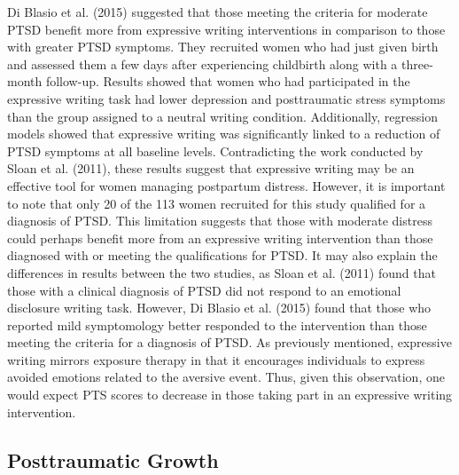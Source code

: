 \documentclass[english,man]{apa6}
\theoremstyle{definition}
\theoremstyle{definition}
\theoremstyle{definition}
\theoremstyle{remark}
\begin{document}
Di Blasio et al. (2015) suggested that those meeting the criteria for
moderate PTSD benefit more from expressive writing interventions in
comparison to those with greater PTSD symptoms. They recruited women who
had just given birth and assessed them a few days after experiencing
childbirth along with a three-month follow-up. Results showed that women
who had participated in the expressive writing task had lower depression
and posttraumatic stress symptoms than the group assigned to a neutral
writing condition. Additionally, regression models showed that
expressive writing was significantly linked to a reduction of PTSD
symptoms at all baseline levels. Contradicting the work conducted by
Sloan et al. (2011), these results suggest that expressive writing may
be an effective tool for women managing postpartum distress. However, it
is important to note that only 20 of the 113 women recruited for this
study qualified for a diagnosis of PTSD. This limitation suggests that
those with moderate distress could perhaps benefit more from an
expressive writing intervention than those diagnosed with or meeting the
qualifications for PTSD. It may also explain the differences in results
between the two studies, as Sloan et al. (2011) found that those with a
clinical diagnosis of PTSD did not respond to an emotional disclosure
writing task. However, Di Blasio et al. (2015) found that those who
reported mild symptomology better responded to the intervention than
those meeting the criteria for a diagnosis of PTSD. As previously
mentioned, expressive writing mirrors exposure therapy in that it
encourages individuals to express avoided emotions related to the
aversive event. Thus, given this observation, one would expect PTS
scores to decrease in those taking part in an expressive writing
intervention.

\subsection{Posttraumatic Growth}\label{posttraumatic-growth}
\end{document}

